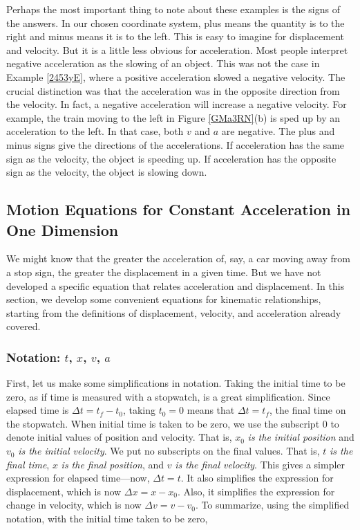 \documentclass[main-ap-physics.tex]{subfiles}
\begin{document}
Perhaps the most important thing to note about these examples is the signs of the answers. In our chosen coordinate system, plus means the quantity is to the right and minus means it is to the left. This is easy to imagine for displacement and velocity. But it is a little less obvious for acceleration. Most people interpret negative acceleration as the slowing of an object. This was not the case in Example \ref{2453yE}, where a positive acceleration slowed a negative velocity. The crucial distinction was that the acceleration was in the opposite direction from the velocity. In fact, a negative acceleration will increase a negative velocity. For example, the train moving to the left in Figure \ref{GMa3RN}(b) is sped up by an acceleration to the left. In that case, both $v$ and $a$ are negative. The plus and minus signs give the directions of the accelerations. If acceleration has the same sign as the velocity, the object is speeding up. If acceleration has the opposite sign as the velocity, the object is slowing down.

\subsection{Motion Equations for Constant Acceleration in One Dimension} \label{WbwyTy}

We might know that the greater the acceleration of, say, a car moving away from a stop sign, the greater the displacement in a given time. But we have not developed a specific equation that relates acceleration and displacement. In this section, we develop some convenient equations for kinematic relationships, starting from the definitions of displacement, velocity, and acceleration already covered.

\subsubsection*{Notation: $t$, $x$, $v$, $a$}

First, let us make some simplifications in notation. Taking the initial time to be zero, as if time is measured with a stopwatch, is a great simplification. Since elapsed time is $\Delta t = t_f - t_0$, taking $t_0 = 0$ means that $\Delta t = t_f$, the final time on the stopwatch. When initial time is taken to be zero, we use the subscript 0 to denote initial values of position and velocity. That is, $x_0$ \textit{is the initial position} and $v_0$ \textit{is the initial velocity}. We put no subscripts on the final values. That is, $t$ \textit{is the final time}, $x$ \textit{is the final position}, and $v$ \textit{is the final velocity}. This gives a simpler expression for elapsed time---now, $\Delta t = t$. It also simplifies the expression for displacement, which is now $\Delta x = x - x_0$. Also, it simplifies the expression for change in velocity, which is now $\Delta v = v - v_0$. To summarize, using the simplified notation, with the initial time taken to be zero,
\end{document}
